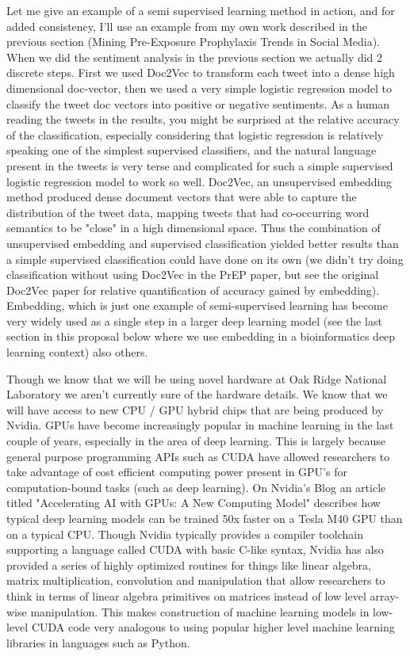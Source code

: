Let me give an example of a semi supervised learning method in action, and for added consistency, I'll use an example from my own work described in the previous section (Mining Pre-Exposure Prophylaxis Trends in Social Media). When we did the sentiment analysis in the previous section we actually did 2 discrete steps. First we used Doc2Vec to transform each tweet into a dense high dimensional doc-vector, then we used a very simple logistic regression model to classify the tweet doc vectors into positive or negative sentiments. As a human reading the tweets in the results, you might be surprised at the relative accuracy of the classification, especially considering that logistic regression is relatively speaking one of the simplest supervised classifiers, and the natural language present in the tweets is very terse and complicated for such a simple supervised logistic regression model to work so well. Doc2Vec, an unsupervised embedding method produced dense document vectors that were able to capture the distribution of the tweet data, mapping tweets that had co-occurring word semantics to be "close" in a high dimensional space. Thus the combination of unsupervised embedding and supervised classification yielded better results than a simple supervised classification could have done on its own (we didn't try doing classification without using Doc2Vec in the PrEP paper, but see the original Doc2Vec paper for relative quantification of accuracy gained by embedding\cite{le2014distributed}). Embedding, which is just one example of semi-supervised learning has become very widely used as a single step in a larger deep learning model (see the last section in this proposal below where we use embedding in a bioinformatics deep learning context) also others\cite{weston2012deep}.

Though we know that we will be using novel hardware at Oak Ridge National Laboratory we aren't currently sure of the hardware details. We know that we will have access to new CPU / GPU hybrid chips that are being produced by Nvidia. GPUs have become increasingly popular in machine learning in the last couple of years, especially in the area of deep learning. This is largely because general purpose programming APIs such as CUDA have allowed researchers to take advantage of cost efficient computing power present in GPU's for computation-bound tasks (such as deep learning). On Nvidia's Blog an article titled "Accelerating AI with GPUs: A New Computing Model" describes how typical deep learning models can be trained 50x faster on a Tesla M40 GPU than on a typical CPU. Though Nvidia typically provides a compiler toolchain supporting a language called CUDA with basic C-like syntax, Nvidia has also provided a series of highly optimized routines for things like linear algebra, matrix multiplication, convolution and manipulation that allow researchers to think in terms of linear algebra primitives on matrices instead of low level array-wise manipulation\cite{chetlur2014cudnn}. This makes construction of machine learning models in low-level CUDA code very analogous to using popular higher level machine learning libraries in languages such as Python.


